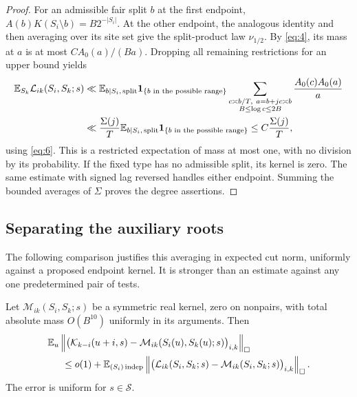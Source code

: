 \begin{proof}
For an admissible fair split $b$ at the first endpoint,
$A(b)K(S_i\setminus b)=B2^{-|S_i|}$. At the other endpoint,
the analogous identity and then averaging over its site set give
the split-product law $\nu_{1/2}$. By \eqref{eq:4}, its mass at
$a$ is at most $CA_0(a)/(Ba)$. Dropping all remaining restrictions
for an upper bound yields
\begin{align*}
 \mathbb E_{S_k}\mathcal L_{ik}(S_i,S_k;s)
 &\ll \mathbb E_{b\mid S_i,\,\mathrm{split}}
 \mathbf 1_{\{b\text{ in the possible range}\}}
 \sum_{\substack{c\asymp b/T,\ a=b+jc\asymp b\\B\le\log c\le2B}}
       \frac{A_0(c)A_0(a)}a\\
 &\ll\frac{\Sigma(j)}T
 \mathbb E_{b\mid S_i,\,\mathrm{split}}
       \mathbf 1_{\{b\text{ in the possible range}\}}
 \le C\frac{\Sigma(j)}T,
\end{align*}
using \eqref{eq:6}. This is a restricted expectation of mass at
most one, with no division by its probability. If the fixed type
has no admissible split, its kernel is zero. The same estimate
with signed lag reversed handles either endpoint. Summing the
bounded averages of $\Sigma$ proves the degree assertions.
\end{proof}

\subsection{Separating the auxiliary roots}

The following comparison justifies this averaging in expected cut norm,
uniformly against a proposed endpoint
kernel. It is stronger than an estimate against any one predetermined
pair of tests.

\begin{proposition}
\label{prop:graph-root-comparison}
Let $\mathcal M_{ik}(S_i,S_k;s)$ be a symmetric real kernel,
zero on nonpairs, with total absolute mass $O(B^{10})$
uniformly in its arguments. Then
\begin{equation}\label{eq:21}
\begin{split}
 &\mathbb E_u\left\|
  \bigl(\mathcal K_{k-i}(u+i,s)
  -\mathcal M_{ik}(S_i(u),S_k(u);s)\bigr)_{i,k}
  \right\|_\square\\
 &\hspace{15pt}\le o(1)+
 \mathbb E_{(S_i)\,\mathrm{indep}}
 \left\|\bigl(\mathcal L_{ik}(S_i,S_k;s)
                   -\mathcal M_{ik}(S_i,S_k;s)\bigr)_{i,k}\right\|_\square.
\end{split}
\end{equation}
The error is uniform for $s\in\mathcal S$.
\end{proposition}

